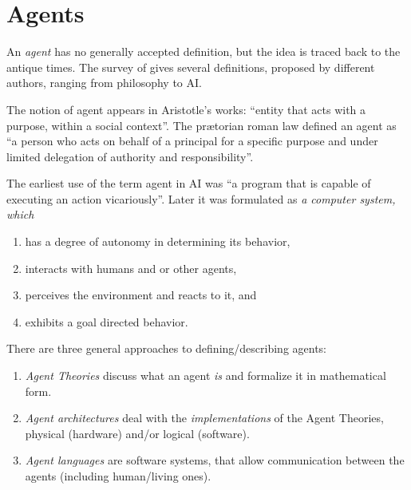 \documentclass[ThesisDoc]{subfiles}
\begin{document}
\section{Agents}
\medskip

\def\domain{\mathrm{domain}}
\def\pop{\mathrm{pop}}

\def\behaviour{\mathrm{behaviour}}
\def\act{\mathrm{act}}
\def\react{\mathrm{react}}
\def\state{\mathrm{state}}
\def\action{\mathrm{action}}
\def\msg{\mathrm{message}}

\medskip

An \emph{agent} has no generally accepted definition, but the idea is traced back
to the antique times. The survey of \cite[sec.~2.2]{PNoriega} gives several
definitions, proposed by different authors, ranging from philosophy to AI.

The notion of agent appears in Aristotle's works:
 ``entity that acts with a purpose, within a social context''.
The prætorian roman law defined an agent as
``a person who acts on behalf of a principal for
a specific purpose and under limited delegation of authority and responsibility''.

The earliest use of the term agent in AI was
``a program that is capable of executing an action vicariously''.
Later it was formulated as \emph{a computer system, which}
\begin{enumerate}
  \item has a degree of autonomy in determining its behavior,
  \item interacts with humans and or other agents,
  \item perceives the environment and reacts to it, and
  \item exhibits a goal directed behavior.
\end{enumerate}

\bigskip

There are three general approaches to defining/describing agents:
\begin{enumerate}
  \item \emph{Agent Theories} discuss what an agent \emph{is} and formalize
    it in mathematical form.
  \item \emph{Agent architectures} deal with the \emph{implementations}
    of the Agent Theories, physical (hardware) and/or logical (software).
  \item \emph{Agent languages} are software systems, that allow communication
    between the agents (including human/living ones).
\end{enumerate}
\end{document}
